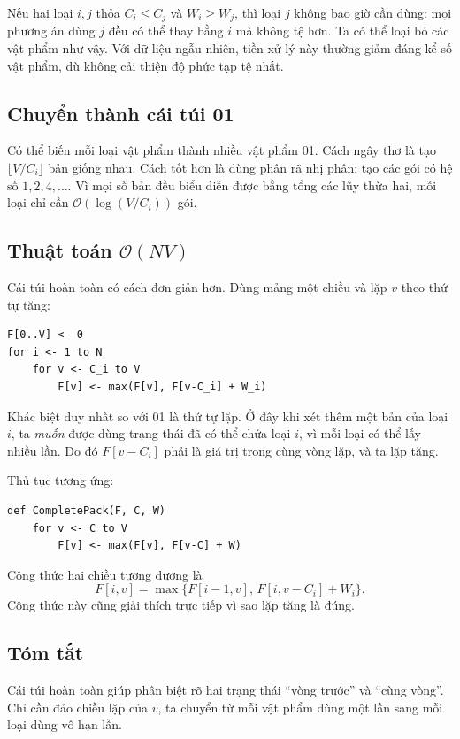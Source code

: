 \documentclass[11pt]{article}
\newcommand{\Oh}{\mathcal{O}}
\begin{document}
Nếu hai loại \(i,j\) thỏa \(C_i\le C_j\) và \(W_i\ge W_j\), thì loại \(j\)
không bao giờ cần dùng: mọi phương án dùng \(j\) đều có thể thay bằng \(i\) mà
không tệ hơn. Ta có thể loại bỏ các vật phẩm như vậy. Với dữ liệu ngẫu nhiên,
tiền xử lý này thường giảm đáng kể số vật phẩm, dù không cải thiện độ phức tạp
tệ nhất.

\subsection{Chuyển thành cái túi 01}

Có thể biến mỗi loại vật phẩm thành nhiều vật phẩm 01. Cách ngây thơ là tạo
\(\lfloor V/C_i\rfloor\) bản giống nhau. Cách tốt hơn là dùng phân rã nhị
phân: tạo các gói có hệ số \(1,2,4,\ldots\). Vì mọi số bản đều biểu diễn được
bằng tổng các lũy thừa hai, mỗi loại chỉ cần \(\Oh(\log(V/C_i))\) gói.

\subsection{Thuật toán \texorpdfstring{\(\Oh(NV)\)}{O(NV)}}

Cái túi hoàn toàn có cách đơn giản hơn. Dùng mảng một chiều và lặp \(v\) theo
thứ tự tăng:
\begin{verbatim}
F[0..V] <- 0
for i <- 1 to N
    for v <- C_i to V
        F[v] <- max(F[v], F[v-C_i] + W_i)
\end{verbatim}

Khác biệt duy nhất so với 01 là thứ tự lặp. Ở đây khi xét thêm một bản của
loại \(i\), ta \emph{muốn} được dùng trạng thái đã có thể chứa loại \(i\), vì
mỗi loại có thể lấy nhiều lần. Do đó \(F[v-C_i]\) phải là giá trị trong cùng
vòng lặp, và ta lặp tăng.

Thủ tục tương ứng:
\begin{verbatim}
def CompletePack(F, C, W)
    for v <- C to V
        F[v] <- max(F[v], F[v-C] + W)
\end{verbatim}

Công thức hai chiều tương đương là
\[
  F[i,v]=\max\{F[i-1,v],\,F[i,v-C_i]+W_i\}.
\]
Công thức này cũng giải thích trực tiếp vì sao lặp tăng là đúng.

\subsection{Tóm tắt}

Cái túi hoàn toàn giúp phân biệt rõ hai trạng thái ``vòng trước'' và ``cùng
vòng''. Chỉ cần đảo chiều lặp của \(v\), ta chuyển từ mỗi vật phẩm dùng một
lần sang mỗi loại dùng vô hạn lần.
\end{document}
